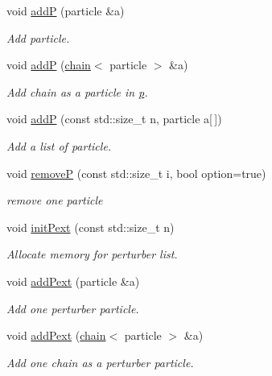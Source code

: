 \begin{DoxyCompactItemize}
void \hyperlink{classARC_1_1chain_a0f91c399beb1e5c0db6ed7e2b4d00477}{addP} (particle \&a)
\begin{DoxyCompactList}\small\item\em Add particle. \end{DoxyCompactList}\item 
void \hyperlink{classARC_1_1chain_a22a0c3e8b42954edee0d2f66a27e8640}{addP} (\hyperlink{classARC_1_1chain}{chain}$<$ particle $>$ \&a)
\begin{DoxyCompactList}\small\item\em Add chain as a particle in \hyperlink{classARC_1_1chain_af1793b656e139e1f87c2e0a55f87514b}{p}. \end{DoxyCompactList}\item 
void \hyperlink{classARC_1_1chain_a658a7b777ac45e7900990dcc6ef0b752}{addP} (const std\+::size\+\_\+t n, particle a\mbox{[}$\,$\mbox{]})
\begin{DoxyCompactList}\small\item\em Add a list of particle. \end{DoxyCompactList}\item 
void \hyperlink{classARC_1_1chain_a6c622f6f09a11f81a72e26de0c8cbfc8}{removeP} (const std\+::size\+\_\+t i, bool option=true)
\begin{DoxyCompactList}\small\item\em remove one particle \end{DoxyCompactList}\item 
void \hyperlink{classARC_1_1chain_a8e31c6a438a72d322889d0ca82fa6bf8}{init\+Pext} (const std\+::size\+\_\+t n)
\begin{DoxyCompactList}\small\item\em Allocate memory for perturber list. \end{DoxyCompactList}\item 
void \hyperlink{classARC_1_1chain_a029906394e7b73881c0980c00bf978f7}{add\+Pext} (particle \&a)
\begin{DoxyCompactList}\small\item\em Add one perturber particle. \end{DoxyCompactList}\item 
void \hyperlink{classARC_1_1chain_a5ab3934ce4a203cd57bfabcc3caf54b3}{add\+Pext} (\hyperlink{classARC_1_1chain}{chain}$<$ particle $>$ \&a)
\begin{DoxyCompactList}\small\item\em Add one chain as a perturber particle. \end{DoxyCompactList}\item 

\end{DoxyCompactItemize}
